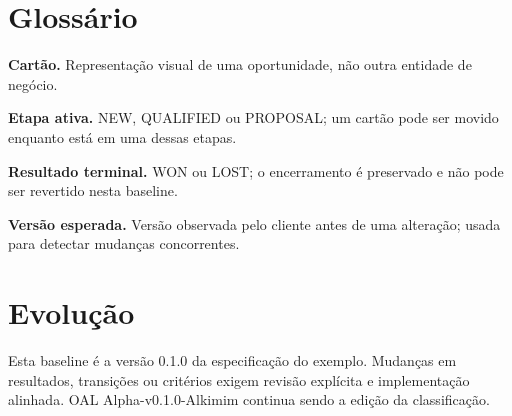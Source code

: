 \documentclass[10pt,a4paper]{article}
\begin{document}
\section{Glossário}

\textbf{Cartão.} Representação visual de uma oportunidade, não outra entidade de negócio.

\textbf{Etapa ativa.} NEW, QUALIFIED ou PROPOSAL; um cartão pode ser movido enquanto está em uma dessas etapas.

\textbf{Resultado terminal.} WON ou LOST; o encerramento é preservado e não pode ser revertido nesta baseline.

\textbf{Versão esperada.} Versão observada pelo cliente antes de uma alteração; usada para detectar mudanças concorrentes.

\section{Evolução}

Esta baseline é a versão 0.1.0 da especificação do exemplo. Mudanças em resultados, transições ou critérios exigem revisão explícita e implementação alinhada. OAL Alpha-v0.1.0-Alkimim continua sendo a edição da classificação.
\end{document}
